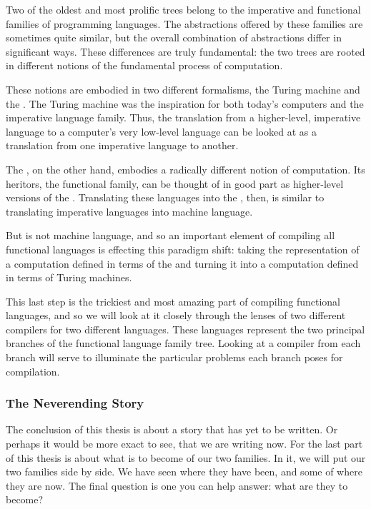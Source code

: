 Two of the oldest and most prolific trees belong to the imperative and functional families of programming languages. The abstractions offered by these families are sometimes quite similar, but the overall combination of abstractions differ in significant ways. These differences are truly fundamental: the two trees are rooted in different notions of the fundamental process of computation.

These notions are embodied in two different formalisms, the Turing machine and the \lambdacalc{}. The Turing machine was the inspiration for both today's computers and the imperative language family. Thus, the translation from a higher-level, imperative language to a computer's very low-level language can be looked at as a translation from one imperative language to another.

The \lambdacalc{}, on the other hand, embodies a radically different notion of computation. Its heritors, the functional family, can be thought of in good part as higher-level versions of the \lambdacalc{}. Translating these languages into the \lambdacalc{}, then, is similar to translating imperative languages into machine language.

But \lambdacalc is not machine language, and so an important element of compiling all functional languages is effecting this paradigm shift: taking the representation of a computation defined in terms of the \lambdacalc and turning it into a computation defined in terms of Turing machines.

This last step is the trickiest and most amazing part of compiling functional languages, and so we will look at it closely through the lenses of two different compilers for two different languages. These languages represent the two principal branches of the functional language family tree. Looking at a compiler from each branch will serve to illuminate the particular problems each branch poses for compilation.

\subsubsection*{The Neverending Story}%
The conclusion of this thesis is about a story that has yet to be written. Or perhaps it would be more exact to see, that we are writing now. For the last part of this thesis is about what is to become of our two families. In it, we will put our two families side by side. We have seen where they have been, and some of where they are now. The final question is one you can help answer: what are they to become?

\fixmarks